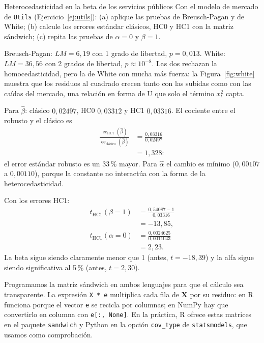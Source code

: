\begin{ejresuelto}{Heterocedasticidad en la beta de los servicios públicos}\label{ej:white}
\enunciado Con el modelo de mercado de \texttt{Utils} (Ejercicio~\ref{ej:utils}): (a) aplique las pruebas de
Breusch-Pagan y de White; (b) calcule los errores estándar clásicos, HC0 y HC1 con la matriz sándwich;
(c) repita las pruebas de $\alpha=0$ y $\beta=1$.

\solucion
{} Breusch-Pagan: $LM=6{,}19$ con 1 grado de libertad, $p=0{,}013$. White:
$LM=36{,}56$ con 2 grados de libertad, $p\approx10^{-8}$. Las dos rechazan la homocedasticidad, pero la de
White con mucha más fuerza: la Figura~\ref{fig:white} muestra que los residuos al cuadrado crecen tanto
con las subidas como con las caídas del mercado, una relación en forma de U que solo el término $x_t^2$ capta.

 Para $\hat\beta$: clásico $0{,}02497$, HC0 $0{,}03312$ y HC1 $0{,}03316$.
El cociente entre el robusto y el clásico es
\begin{align*}
  \frac{\operatorname{ee}_{\mathrm{HC1}}(\hat\beta)}{\operatorname{ee}_{\text{clásico}}(\hat\beta)}
    &= \frac{0{,}03316}{0{,}02497}\\
    &= 1{,}328 :
\end{align*}
el error estándar robusto es un 33\,\% mayor. Para $\hat\alpha$ el cambio es mínimo ($0{,}00107$ a
$0{,}00110$), porque la constante no interactúa con la forma de la heterocedasticidad.

 Con los errores HC1:
\begin{align*}
  t_{\mathrm{HC1}}(\beta=1)  &= \frac{0{,}54087-1}{0{,}03316}\\
                             &= -13{,}85,\\
  t_{\mathrm{HC1}}(\alpha=0) &= \frac{0{,}0024625}{0{,}0011043}\\
                             &= 2{,}23 .
\end{align*}
La beta sigue siendo claramente menor que 1 (antes, $t=-18{,}39$) y la alfa sigue siendo significativa al
5\,\% (antes, $t=2{,}30$).


\RvsPy Programamos la matriz sándwich en ambos lenguajes para que el cálculo sea transparente. La
expresión \texttt{X * e} multiplica cada fila de $\bm X$ por su residuo: en R funciona porque el vector
\texttt{e} se recicla por columnas; en NumPy hay que convertirlo en columna con \texttt{e[:, None]}. En la
práctica, R ofrece estas matrices en el paquete \texttt{sandwich} y Python en la opción \texttt{cov\_type}
de \texttt{statsmodels}, que usamos como comprobación.


\end{ejresuelto}
